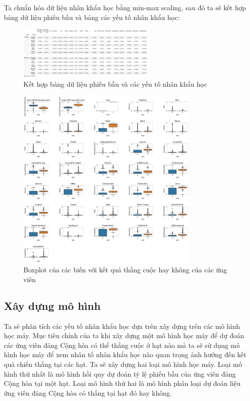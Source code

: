 \documentclass[14pt, a4paper]{article}
\numberwithin{equation}{section}
\numberwithin{figure}{section}
\numberwithin{dl}{section}
\numberwithin{md}{section}
\numberwithin{bd}{section}
\numberwithin{dn}{section}
\numberwithin{hq}{section}
\begin{document}
    Ta chuẩn hóa dữ liệu nhân khẩu học bằng min-max scaling, sau đó ta sẽ kết hợp bảng dữ liệu phiếu bầu và bảng các yếu tố nhân khẩu học:

    \begin{figure}[h!]
        \centering
        \includegraphics[width=0.6\textwidth]{figures/President_Normalized_Demographic_Merged_Dataframe.png}
        \caption{Kết hợp bảng dữ liệu phiếu bầu và các yếu tố nhân khẩu học}
    \end{figure}

    \begin{figure}[h!]
        \centering
        \includegraphics[width=0.8\textwidth]{figures/Box_plot.png}
        \caption{Boxplot của các biến với kết quả thắng cuộc hay không của các ứng viên}
    \end{figure}

    \subsection{Xây dựng mô hình}

    Ta sẽ phân tích các yếu tố nhân khẩu học dựa trên xây dựng trên các mô hình học máy.
    Mục tiêu chính của ta khi xây dựng một mô hình học máy để dự đoán các ứng viên đảng Cộng hòa có thể thắng cuộc ở hạt nào mà ta sẽ sử dụng mô hình học máy để xem nhân tố nhân khẩu học nào quan trọng ảnh hưởng đến kết quả chiến thắng tại các hạt.
    Ta sẽ xây dựng hai loại mô hình học máy. 
    Loại mô hình thứ nhất là mô hình hồi quy dự đoán tỷ lệ phiếu bầu của ứng viên đảng Cộng hòa tại một hạt.
    Loại mô hình thứ hai là mô hình phân loại dự đoán liệu ứng viên đảng Cộng hòa có thắng tại hạt đó hay không.
\end{document}
